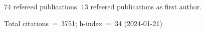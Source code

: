 74 refereed publications. 13 refeered publications as first author.

Total citations~=~3751; h-index~=~34 (2024-01-21)